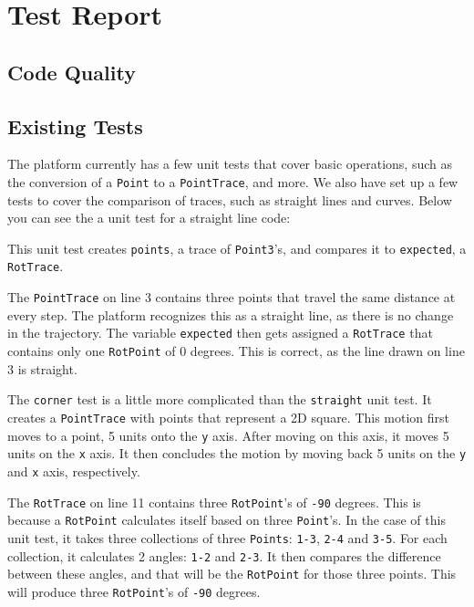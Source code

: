 \documentclass[a4paper]{article}
\begin{document}
  \section{Test Report}
  \subsection{Code Quality} %
  \subsection{Existing Tests} %
  The platform currently has a few unit tests that cover basic operations, such
  as the conversion of a \verb_Point_ to a \verb_PointTrace_, and more. We also
  have set up a few tests to cover the comparison of traces, such as straight
  lines and curves. Below you can see the a unit test for a straight line code:
  

  This unit test creates \verb_points_, a trace of \verb_Point3_'s, and compares
  it to \verb_expected_, a \verb_RotTrace_.

  The \verb_PointTrace_ on line 3 contains three points that travel the same
  distance at every step. The platform recognizes this as a straight line, as
  there is no change in the trajectory. The variable \verb_expected_ then gets
  assigned a \verb_RotTrace_ that contains only one \verb_RotPoint_ of 0
  degrees. This is correct, as the line drawn on line 3 is straight.

  
  The \verb_corner_ test is a little more complicated than the \verb_straight_
  unit test. It creates a \verb_PointTrace_ with points that represent a 2D
  square. This motion first moves to a point, 5 units onto the \verb_y_ axis.
  After moving on this axis, it moves 5 units on the \verb_x_ axis. It then
  concludes the motion by moving back 5 units on the \verb_y_ and \verb_x_ axis,
  respectively.

  The \verb_RotTrace_ on line 11 contains three \verb_RotPoint_'s of \verb_-90_
  degrees. This is because a \verb_RotPoint_ calculates itself based on three
  \verb_Point_'s. In the case of this unit test, it takes three collections of
  three \verb_Points_: \verb_1-3_, \verb_2-4_ and \verb_3-5_. For each
  collection, it calculates 2 angles: \verb_1-2_ and \verb_2-3_. It then
  compares the difference between these angles, and that will be the
  \verb_RotPoint_ for those three points. This will produce three
  \verb_RotPoint_'s of \verb_-90_ degrees.
\end{document}
